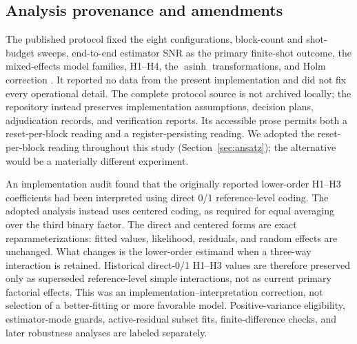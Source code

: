 \documentclass[pdflatex,sn-basic,Numbered]{sn-jnl}
\begin{document}
\subsection{Analysis provenance and amendments}\label{sec:provenance}

The published protocol fixed the eight configurations, block-count and shot-budget sweeps, end-to-end estimator SNR as the primary finite-shot outcome, the mixed-effects model families, H1--H4, the $\operatorname{asinh}$ transformations, and Holm correction \cite{shen2026gradient}. It reported no data from the present implementation and did not fix every operational detail. The complete protocol source is not archived locally; the repository instead preserves implementation assumptions, decision plans, adjudication records, and verification reports. Its accessible prose permits both a reset-per-block reading and a register-persisting reading. We adopted the reset-per-block reading throughout this study (Section~\ref{sec:ansatz}); the alternative would be a materially different experiment.

An implementation audit found that the originally reported lower-order H1--H3 coefficients had been interpreted using direct 0/1 reference-level coding. The adopted analysis instead uses centered coding, as required for equal averaging over the third binary factor. The direct and centered forms are exact reparameterizations: fitted values, likelihood, residuals, and random effects are unchanged. What changes is the lower-order estimand when a three-way interaction is retained. Historical direct-0/1 H1--H3 values are therefore preserved only as superseded reference-level simple interactions, not as current primary factorial effects. This was an implementation--interpretation correction, not selection of a better-fitting or more favorable model. Positive-variance eligibility, estimator-mode guards, active-residual subset fits, finite-difference checks, and later robustness analyses are labeled separately.
\end{document}

